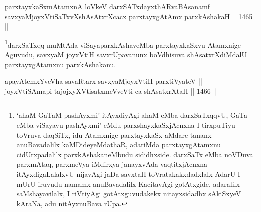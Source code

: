 
\begin{shl}
parxtayxkaSxmAtamxnA loVkeV darxSATxdayxthARvaBAsanamf || \\
savxyaMjoyxVtiSaTxvXshAsAtxrXcacx parxtayxgAtAmx parxkAshakaH \hfill || 1465 ||  
\end{shl}

\begin{artha}
\footnote{`ahaM GaTaM pashAyxmi' itAyxdiyAgi ahaM eMba darxSaTxqqvU, GaTa eMba viSayavu pashAyxmi' eMdu parxshayxkaSxjAcnxna I tirxpuTiyu toVruva daqSiTx, idu Atamxnige parxtayxkaSx aMdare tananx anuBavadalilx kaMDideyeMdathaR, adariMda parxtayxgAtamxnu cidUrxpadalilx parxkAshakaneMbudu sididhxside. darxSaTx eMba noVDuva parxmAtaq, parxmeVya iMdirxya janayxvAda vaqtitxjAcnxna itAyxdigaLalalxvU nijavAgi jaDa savxtaH toVratakakxdadxlalx AdarU I mUrU iruvudu namamx anuBavadalilx KacitavAgi gotAtxgide, adaralilx saMshayavilalx, I riVtiyAgi gotAtxguvudakekx nitayxsidadhx sAkiSxyeV kAraNa, adu nitAyxnuBava rUpa.}darxSaTxqq muMtAda viSayaparxkAshaveMba parxtayxkaSxvu Atamxnige Aguvudu, savxyaM joyxVtiH savxrUpavanunx boVdhisuva shAsatxrXdiMdalU parxtayxgAtamxnu parxkAshakanu.
\end{artha}


\begin{shl}
\footnotemark[3]apayAtemxYveVha savaRtarx savxyaMjoyxVtiH parxtiVyateV || \\
joyxVtiSAmapi tajojxyXVtisatxmeVveVti ca shAsatxrXtaH \hfill || 1466 ||  
\end{shl}

